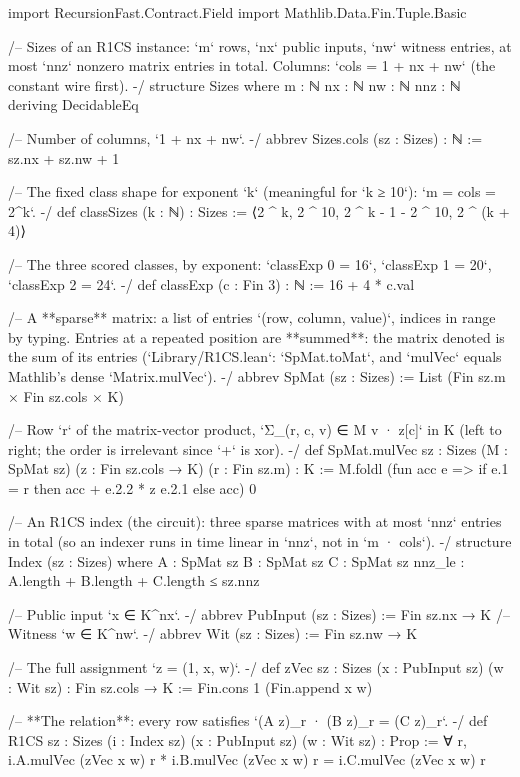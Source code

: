 \begin{leancode}[fontsize=\scriptsize,label={\footnotesize Contract/R1CS.lean}]
import RecursionFast.Contract.Field
import Mathlib.Data.Fin.Tuple.Basic

/-- Sizes of an R1CS instance: `m` rows, `nx` public inputs, `nw` witness entries, at most
`nnz` nonzero matrix entries in total. Columns: `cols = 1 + nx + nw` (the constant wire first). -/
structure Sizes where
  m : ℕ
  nx : ℕ
  nw : ℕ
  nnz : ℕ
  deriving DecidableEq

/-- Number of columns, `1 + nx + nw`. -/
abbrev Sizes.cols (sz : Sizes) : ℕ := sz.nx + sz.nw + 1

/-- The fixed class shape for exponent `k` (meaningful for `k ≥ 10`): `m = cols = 2^k`. -/
def classSizes (k : ℕ) : Sizes := ⟨2 ^ k, 2 ^ 10, 2 ^ k - 1 - 2 ^ 10, 2 ^ (k + 4)⟩

/-- The three scored classes, by exponent: `classExp 0 = 16`, `classExp 1 = 20`, `classExp 2 = 24`. -/
def classExp (c : Fin 3) : ℕ := 16 + 4 * c.val

/-- A **sparse** matrix: a list of entries `(row, column, value)`, indices in range by typing.
Entries at a repeated position are **summed**: the matrix denoted is the sum of its entries
(`Library/R1CS.lean`: `SpMat.toMat`, and `mulVec` equals Mathlib's dense `Matrix.mulVec`). -/
abbrev SpMat (sz : Sizes) := List (Fin sz.m × Fin sz.cols × K)

/-- Row `r` of the matrix-vector product, `Σ_{(r, c, v) ∈ M} v · z[c]` in K (left to right; the
order is irrelevant since `+` is xor). -/
def SpMat.mulVec {sz : Sizes} (M : SpMat sz) (z : Fin sz.cols → K) (r : Fin sz.m) : K :=
  M.foldl (fun acc e => if e.1 = r then acc + e.2.2 * z e.2.1 else acc) 0

/-- An R1CS index (the circuit): three sparse matrices with at most `nnz` entries in total (so an
indexer runs in time linear in `nnz`, not in `m · cols`). -/
structure Index (sz : Sizes) where
  A : SpMat sz
  B : SpMat sz
  C : SpMat sz
  nnz_le : A.length + B.length + C.length ≤ sz.nnz

/-- Public input `x ∈ K^nx`. -/
abbrev PubInput (sz : Sizes) := Fin sz.nx → K
/-- Witness `w ∈ K^nw`. -/
abbrev Wit (sz : Sizes) := Fin sz.nw → K

/-- The full assignment `z = (1, x, w)`. -/
def zVec {sz : Sizes} (x : PubInput sz) (w : Wit sz) : Fin sz.cols → K := Fin.cons 1 (Fin.append x w)

/-- **The relation**: every row satisfies `(A z)_r · (B z)_r = (C z)_r`. -/
def R1CS {sz : Sizes} (i : Index sz) (x : PubInput sz) (w : Wit sz) : Prop :=
  ∀ r, i.A.mulVec (zVec x w) r * i.B.mulVec (zVec x w) r = i.C.mulVec (zVec x w) r


\end{leancode}

